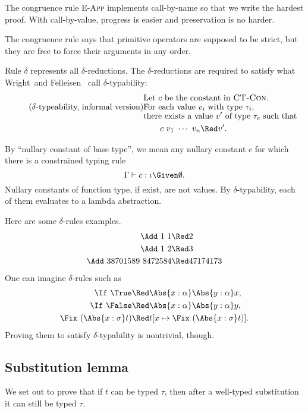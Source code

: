\documentclass{amsart}
\theoremstyle{definition}
\begin{document}
The congruence rule \textsc{E-App} implements call-by-name so
that we write the hardest proof. With call-by-value, progress is
easier and preservation is no harder.

The congruence rule  says that primitive operators
are supposed to be strict, but they are free to force their
arguments in any order.

Rule \textsc{$\delta$} represents all $\delta$-reductions. The
$\delta$-reductions are required to satisfy what
Wright~and Felleisen~\cite{Wright94} call $\delta$-typability:
\begin{align*}
&\text{Let $c$ be the constant in \textsc{CT-Con}.}\\[-4pt]
\tag{$\delta$-typeability, informal version}\label{delta-typability}
&\text{For each value $v_i$ with type $\tau_i$,}\\[-4pt]
&\text{there exists a value $v'$ of type $\tau_c$ such that}\\
&\hspace{2em}c~v_1~\cdots~v_n\Red v'.
\end{align*}

By ``nullary constant of base type'', we mean any nullary
constant $c$ for which there is a constrained typing rule
\[
\Gamma\vdash c:\iota\Given\emptyset.
\]
Nullary constants of function type, if exist, are not values. By
$\delta$-typability, each of them evaluates to a lambda
abstraction.

Here are some $\delta$-rules examples.
\begin{align*}
\Add~1~1&\Red2\\
\Add~1~2&\Red3\\
\Add~38701589~8472584&\Red47174173
\end{align*}
One can imagine $\delta$-rules such as
\begin{align*}
\If~\True &\Red\Abs{x:\alpha}\Abs{y:\alpha}x,\\
\If~\False&\Red\Abs{x:\alpha}\Abs{y:\alpha}y,\\
\Fix~(\Abs{x:\sigma} t)&\Red t[x\mapsto \Fix~(\Abs{x:\sigma} t)].
\end{align*}
Proving them to satisfy $\delta$-typability is nontrivial,
though.

\subsection{Substitution lemma}

We set out to prove that if $t$ can be typed $\tau$, then after
a well-typed substitution it can still be typed $\tau$.
\end{document}
